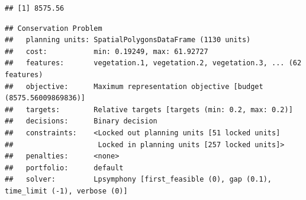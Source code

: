 \documentclass[12pt,]{book}
\newenvironment{Shaded}{\begin{snugshade}}{\end{snugshade}}
\newcommand{\KeywordTok}[1]{\textcolor[rgb]{0.13,0.29,0.53}{\textbf{#1}}}
\newcommand{\DataTypeTok}[1]{\textcolor[rgb]{0.13,0.29,0.53}{#1}}
\newcommand{\DecValTok}[1]{\textcolor[rgb]{0.00,0.00,0.81}{#1}}
\newcommand{\FloatTok}[1]{\textcolor[rgb]{0.00,0.00,0.81}{#1}}
\newcommand{\StringTok}[1]{\textcolor[rgb]{0.31,0.60,0.02}{#1}}
\newcommand{\CommentTok}[1]{\textcolor[rgb]{0.56,0.35,0.01}{\textit{#1}}}
\newcommand{\OtherTok}[1]{\textcolor[rgb]{0.56,0.35,0.01}{#1}}
\newcommand{\OperatorTok}[1]{\textcolor[rgb]{0.81,0.36,0.00}{\textbf{#1}}}
\newcommand{\NormalTok}[1]{#1}
\begin{document}
\begin{Shaded}
\end{Shaded}

\begin{verbatim}
## [1] 8575.56
\end{verbatim}

\begin{Shaded}
\end{Shaded}

\begin{verbatim}
## Conservation Problem
##   planning units: SpatialPolygonsDataFrame (1130 units)
##   cost:           min: 0.19249, max: 61.92727
##   features:       vegetation.1, vegetation.2, vegetation.3, ... (62 features)
##   objective:      Maximum representation objective [budget (8575.56009869836)]
##   targets:        Relative targets [targets (min: 0.2, max: 0.2)]
##   decisions:      Binary decision 
##   constraints:    <Locked out planning units [51 locked units]
##                    Locked in planning units [257 locked units]>
##   penalties:      <none>
##   portfolio:      default
##   solver:         Lpsymphony [first_feasible (0), gap (0.1), time_limit (-1), verbose (0)]
\end{verbatim}
\end{document}
